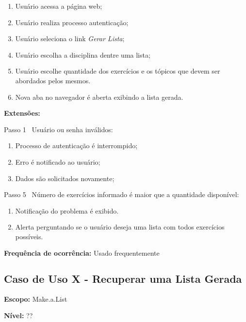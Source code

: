 \documentclass[12pt,oneside,a4paper,article]{abntex2}
\begin{document}
		\begin{enumerate}
			\item Usuário acessa a página web;
			
			\item Usuário realiza processo autenticação;
			
			\item Usuário seleciona o link \textit{Gerar Lista};
			
			\item Usuário escolha a disciplina dentre uma lista;
			
			\item Usuário escolhe quantidade dos exercícios e os tópicos que devem ser abordados pelos mesmos.	
			
			\item Nova aba no navegador é aberta exibindo a lista gerada.
			
		\end{enumerate}
		
		\textbf{Extensões:} 
		
		Passo 1 \textrightarrow \ Usuário ou senha inválidos:
		
		\begin{enumerate}[label=\alph*.]	
			\item Processo de autenticação é interrompido;
			\item Erro é notificado ao usuário;
			\item Dados são solicitados novamente;
		\end{enumerate}
		
		Passo 5 \textrightarrow \ Número de exercícios informado é maior que a quantidade disponível:
		
		\begin{enumerate}[label=\alph*.]	
			\item Notificação do problema é exibido.
			\item Alerta perguntando se o usuário deseja uma lista com todos exercícios possíveis.
		\end{enumerate}
		
		\textbf{Frequência de ocorrência:} Usado frequentemente
	
		\subsection{Caso de Uso X - Recuperar uma Lista Gerada}
		
		\textbf{Escopo:} Make.a.List 
		
		\textbf{Nível:} ??
		
\end{document}
